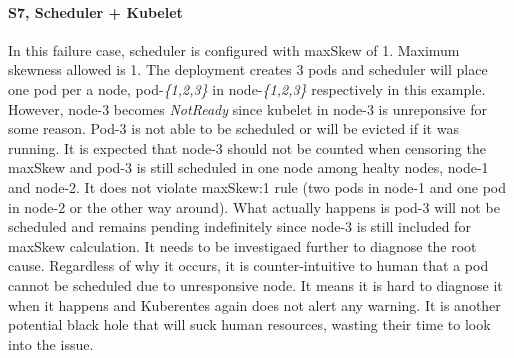 \paragraph*{S7, Scheduler + Kubelet}
In this failure case, scheduler is configured with maxSkew of 1. Maximum skewness allowed is 1. The deployment creates 3 pods and scheduler will place one pod per a node, pod-\textit{\{1,2,3\}} in node-\textit{\{1,2,3\}} respectively in this example. However, node-3 becomes \textit{NotReady} since kubelet in node-3 is unreponsive for some reason. Pod-3 is not able to be scheduled or will be evicted if it was running. It is expected that node-3 should not be counted when censoring the maxSkew and pod-3 is still scheduled in one node among healty nodes, node-1 and node-2. It does not violate maxSkew:1 rule (two pods in node-1 and one pod in node-2 or the other way around). What actually happens is pod-3 will not be scheduled and remains pending indefinitely since node-3 is still included for maxSkew calculation. It needs to be investigaed further to diagnose the root cause. Regardless of why it occurs, it is counter-intuitive to human that a pod cannot be scheduled due to unresponsive node. It means it is hard to diagnose it when it happens and Kuberentes again does not alert any warning. It is another potential black hole that will suck human resources, wasting their time to look into the issue.
